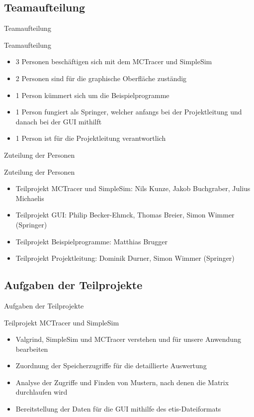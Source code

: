 \begin{frame}
\tiny{}
\end{frame}

\subsection{Teamaufteilung}
\begin{frame}{Teamaufteilung}
\begin{block}{Teamaufteilung}
\begin{itemize}[<+->]
\pause\item 3 Personen beschäftigen sich mit dem MCTracer und SimpleSim
\item 2 Personen sind für die graphische Oberfläche zuständig
\item 1 Person kümmert sich um die Beispielprogramme
\item 1 Person fungiert als Springer, welcher anfangs bei der Projektleitung und danach bei der GUI mithilft
\item 1 Person ist für die Projektleitung verantwortlich
\end{itemize}
\end{block}
\end{frame}

\begin{frame}{Zuteilung der Personen}
\begin{block}{Zuteilung der Personen}
\begin{itemize}[<+->]
\pause\item Teilprojekt MCTracer und SimpleSim: Nils Kunze, Jakob Buchgraber, Julius Michaelis
\item Teilprojekt GUI: Philip Becker-Ehmck, Thomas Breier, Simon Wimmer (Springer)
\item Teilprojekt Beispielprogramme: Matthias Brugger
\item Teilprojekt Projektleitung: Dominik Durner, Simon Wimmer (Springer)
\end{itemize}
\end{block}
\end{frame}

\subsection{Aufgaben der Teilprojekte}

\begin{frame}{Aufgaben der Teilprojekte}
\begin{block}{Teilprojekt MCTracer und SimpleSim}
\begin{itemize}[<+->]
\pause\item Valgrind, SimpleSim und MCTracer verstehen und für unsere Anwendung bearbeiten
\item Zuordnung der Speicherzugriffe für die detaillierte Auswertung
\item Analyse der Zugriffe und Finden von Mustern, nach denen die Matrix durchlaufen wird
\item Bereitstellung der Daten für die GUI mithilfe des \glqq etis\grqq-Dateiformats
\end{itemize}
\end{block}
\end{frame}

